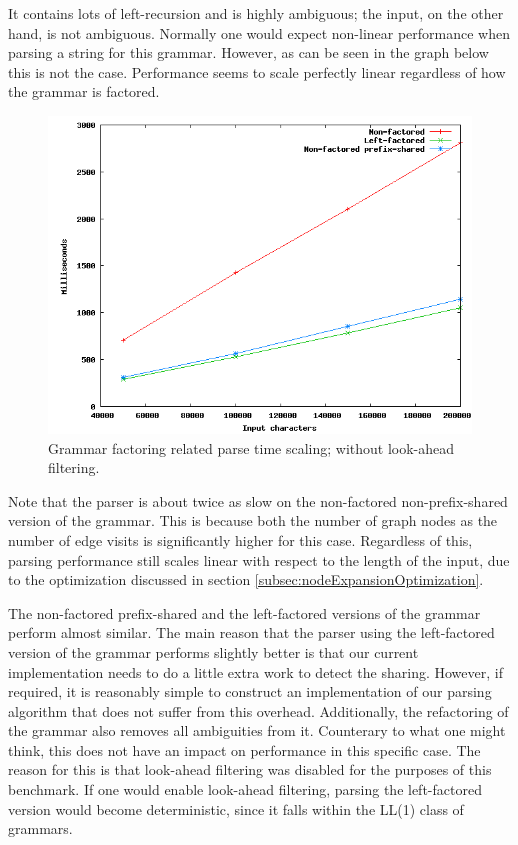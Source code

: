 \documentclass[a4paper,10pt]{article}
\begin{document}
It contains lots of left-recursion and is highly ambiguous; the input, on the other hand, is not ambiguous. Normally one would expect non-linear performance when parsing a string for this grammar. However, as can be seen in the graph below this is not the case. Performance seems to scale perfectly linear regardless of how the grammar is factored.

\begin{figure}[H]
\centering
\includegraphics[scale=0.5]{grammar-factoring.png}
\caption{Grammar factoring related parse time scaling; without look-ahead filtering.}
\end{figure}

Note that the parser is about twice as slow on the non-factored non-prefix-shared version of the grammar. This is because both the number of graph nodes as the number of edge visits is significantly higher for this case. Regardless of this, parsing performance still scales linear with respect to the length of the input, due to the optimization discussed in section \ref{subsec:nodeExpansionOptimization}.

The non-factored prefix-shared and the left-factored versions of the grammar perform almost similar. The main reason that the parser using the left-factored version of the grammar performs slightly better is that our current implementation needs to do a little extra work to detect the sharing. However, if required, it is reasonably simple to construct an implementation of our parsing algorithm that does not suffer from this overhead. Additionally, the refactoring of the grammar also removes all ambiguities from it. Counterary to what one might think, this does not have an impact on performance in this specific case. The reason for this is that look-ahead filtering was disabled for the purposes of this benchmark. If one would enable look-ahead filtering, parsing the left-factored version would become deterministic, since it falls within the LL(1) class of grammars.
\end{document}
